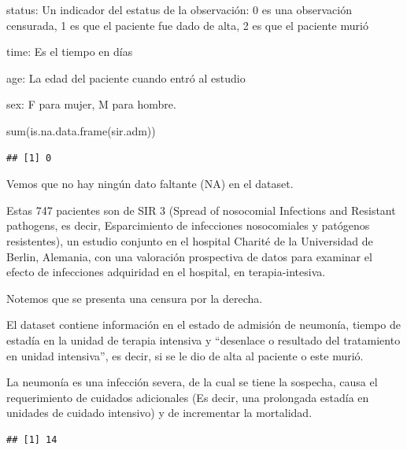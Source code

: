 \documentclass[
]{article}
\newenvironment{Shaded}{\begin{snugshade}}{\end{snugshade}}
\newcommand{\DecValTok}[1]{\textcolor[rgb]{0.00,0.00,0.81}{#1}}
\newcommand{\FunctionTok}[1]{\textcolor[rgb]{0.00,0.00,0.00}{#1}}
\newcommand{\NormalTok}[1]{#1}
\newcommand{\SpecialCharTok}[1]{\textcolor[rgb]{0.00,0.00,0.00}{#1}}
\begin{document}
status: Un indicador del estatus de la observación: 0 es una observación
censurada, 1 es que el paciente fue dado de alta, 2 es que el paciente
murió

time: Es el tiempo en días

age: La edad del paciente cuando entró al estudio

sex: F para mujer, M para hombre.

\begin{Shaded}
\begin{Highlighting}[]
\FunctionTok{sum}\NormalTok{(}\FunctionTok{is.na.data.frame}\NormalTok{(sir.adm))}
\end{Highlighting}
\end{Shaded}

\begin{verbatim}
## [1] 0
\end{verbatim}

Vemos que no hay ningún dato faltante (NA) en el dataset.

Estas 747 pacientes son de SIR 3 (Spread of nosocomial Infections and
Resistant pathogens, es decir, Esparcimiento de infecciones nosocomiales
y patógenos resistentes), un estudio conjunto en el hospital Charité de
la Universidad de Berlin, Alemania, con una valoración prospectiva de
datos para examinar el efecto de infecciones adquiridad en el hospital,
en terapia-intesiva.

Notemos que se presenta una censura por la derecha.

El dataset contiene información en el estado de admisión de neumonía,
tiempo de estadía en la unidad de terapia intensiva y ``desenlace o
resultado del tratamiento en unidad intensiva'', es decir, si se le dio
de alta al paciente o este murió.

La neumonía es una infección severa, de la cual se tiene la sospecha,
causa el requerimiento de cuidados adicionales (Es decir, una prolongada
estadía en unidades de cuidado intensivo) y de incrementar la
mortalidad.

\begin{Shaded}
\end{Shaded}

\begin{verbatim}
## [1] 14
\end{verbatim}
\end{document}
